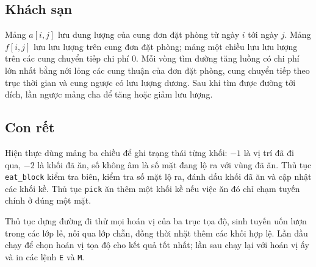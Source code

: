 \documentclass[11pt]{article}
\begin{document}
\subsection{Khách sạn}

Mảng $a[i,j]$ lưu dung lượng của cung đơn đặt phòng từ ngày $i$ tới ngày
$j$. Mảng $f[i,j]$ lưu lưu lượng trên cung đơn đặt phòng; mảng một chiều lưu
lưu lượng trên các cung chuyển tiếp chi phí $0$. Mỗi vòng tìm đường tăng
luồng có chi phí lớn nhất bằng nới lỏng các cung thuận của đơn đặt phòng,
cung chuyển tiếp theo trục thời gian và cung ngược có lưu lượng dương. Sau
khi tìm được đường tới đích, lần ngược mảng cha để tăng hoặc giảm lưu lượng.

\subsection{Con rết}

Hiện thực dùng mảng ba chiều để ghi trạng thái từng khối:
$-1$ là vị trí đã đi qua, $-2$ là khối đã ăn, số không âm là số mặt đang lộ
ra với vùng đã ăn. Thủ tục \texttt{eat\_block} kiểm tra biên, kiểm tra số mặt
lộ ra, đánh dấu khối đã ăn và cập nhật các khối kề. Thủ tục \texttt{pick}
ăn thêm một khối kề nếu việc ăn đó chỉ chạm tuyến chính ở đúng một mặt.

Thủ tục dựng đường đi thử mọi hoán vị của ba trục tọa độ, sinh tuyến uốn
lượn trong các lớp lẻ, nối qua lớp chẵn, đồng thời nhặt thêm các khối hợp lệ.
Lần đầu chạy để chọn hoán vị tọa độ cho kết quả tốt nhất; lần sau chạy lại
với hoán vị ấy và in các lệnh \texttt{E} và \texttt{M}.
\end{document}
